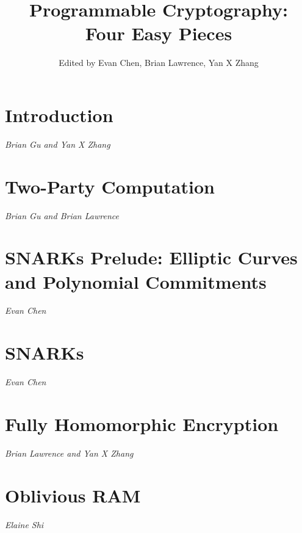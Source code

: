 \documentclass{scrreprt}
\title{Programmable Cryptography: \\ Four Easy Pieces}
\author{Edited by Evan Chen, Brian Lawrence, Yan X Zhang}
\newcommand{\credits}[1]{\noindent\emph{#1}\vspace{2em}}
\begin{document}
\maketitle

\newpage

\tableofcontents

\chapter{Introduction}
\credits{Brian Gu and Yan X Zhang}


\chapter{Two-Party Computation}
\credits{Brian Gu and Brian Lawrence}




\chapter{SNARKs Prelude: Elliptic Curves and Polynomial Commitments}
\credits{Evan Chen}





\chapter{SNARKs}
\credits{Evan Chen}






\chapter{Fully Homomorphic Encryption}
\credits{Brian Lawrence and Yan X Zhang}






\chapter{Oblivious RAM}
\credits{Elaine Shi}


\end{document}
